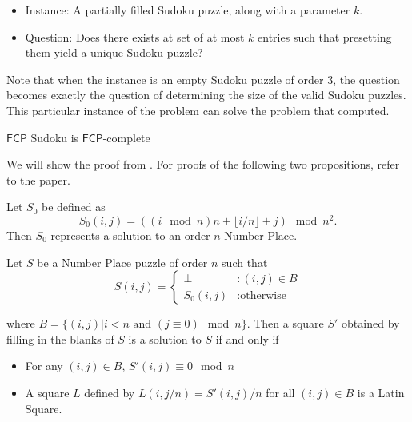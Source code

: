 \documentclass[runningheads,a4paper]{llncs}
\begin{document}
\begin{itemize}
\item Instance: A partially filled Sudoku puzzle, along with a parameter $k$.
\item Question: Does there exists at set of at most $k$ entries such that presetting them yield a unique Sudoku puzzle?
\end{itemize}

Note that when the instance is an empty Sudoku puzzle of order 3, the question becomes exactly the question of determining the size of the valid Sudoku puzzles. This particular instance of the problem can solve the problem that \cite{mcguire2012there} computed. 

\begin{theorem}
$\mathsf{FCP}$ Sudoku is $\mathsf{FCP}$-complete
\end{theorem}

We will show the proof from \cite{takayuki2003complexity}. For proofs of the following two propositions, refer to the paper. 

\begin{proposition}
Let $S_0$ be defined as
$$S_0 (i,j) = ((i \mod n) n + \lfloor i/n \rfloor + j) \mod n^2. $$
Then $S_0$ represents a solution to an order $n$ Number Place. 
\end{proposition}

\begin{proposition}
Let $S$ be a Number Place puzzle of order $n$ such that
\begin{displaymath}
S(i,j) = \left\{
\begin{array}{lr}
\perp & : (i,j) \in B\\
S_0 (i,j) & : \text{otherwise}
\end{array}
\right.
\end{displaymath}

where $B = \{ (i,j) | i < n \text{ and } (j \equiv 0) \mod n \}$. Then a square $S'$ obtained by filling in the blanks of $S$ is a solution to $S$ if and only if

\begin{itemize}
\item For any $(i,j) \in B$, $S'(i,j) \equiv 0 \mod n$
\item A square $L$ defined by $L(i, j/n) = S'(i,j)/n$ for all $(i, j) \in B$ is a Latin Square.
\end{itemize}

\end{proposition}
\end{document}
